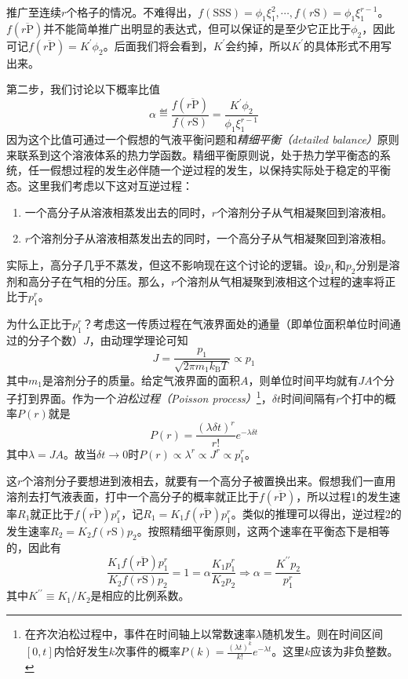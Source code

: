 \documentclass[main.tex]{subfiles}
\begin{document}
推广至连续$r$个格子的情况。不难得出，$f\left(\text{SSS}\right)=\phi_1\xi_1^2,\cdots,f\left(r\text{S}\right)=\phi_1\xi_1^{r-1}$。$f\left(\overline{r\text{P}}\right)$并不能简单推广出明显的表达式，但可以保证的是至少它正比于$\phi_2$，因此可记$f\left(\overline{r\text{P}}\right)=K^\prime\phi_2$。后面我们将会看到，$K^\prime$会约掉，所以$K^\prime$的具体形式不用写出来。

第二步，我们讨论以下概率比值
\[\alpha\eqdef\frac{f\left(\overline{r\text{P}}\right)}{f\left(r\text{S}\right)}=\frac{K^\prime\phi_2}{\phi_1\xi_1^{r-1}}\]
因为这个比值可通过一个假想的气液平衡问题和\emph{精细平衡（detailed balance）}原则来联系到这个溶液体系的热力学函数。精细平衡原则说，处于热力学平衡态的系统，任一假想过程的发生必伴随一个逆过程的发生，以保持实际处于稳定的平衡态。这里我们考虑以下这对互逆过程：
\begin{enumerate}
  \item 一个高分子从溶液相蒸发出去的同时，$r$个溶剂分子从气相凝聚回到溶液相。
  \item $r$个溶剂分子从溶液相蒸发出去的同时，一个高分子从气相凝聚回到溶液相。
\end{enumerate}
实际上，高分子几乎不蒸发，但这不影响现在这个讨论的逻辑。设$p_1$和$p_2$分别是溶剂和高分子在气相的分压。那么，$r$个溶剂从气相凝聚到液相这个过程的速率将正比于$p_1^r$。

为什么正比于$p_1^r$？考虑这一传质过程在气液界面处的通量（即单位面积单位时间通过的分子个数）$J$，由动理学理论可知
\[J=\frac{p_1}{\sqrt{2\pi m_1 k_\text{B}T}}\propto p_1\]
其中$m_1$是溶剂分子的质量。给定气液界面的面积$A$，则单位时间平均就有$JA$个分子打到界面。作为一个\emph{泊松过程（Poisson process）}\footnote{在齐次泊松过程中，事件在时间轴上以常数速率$\lambda$随机发生。则在时间区间$\left[0,t\right]$内恰好发生$k$次事件的概率$P\left(k\right)=\frac{\left(\lambda t\right)^k}{k!}e^{-\lambda t}$。这里$k$应该为非负整数。}，$\delta t$时间间隔有$r$个打中的概率$P\left(r\right)$就是
\[P\left(r\right)=\frac{\left(\lambda\delta t\right)^r}{r!}e^{-\lambda\delta t}\]
其中$\lambda=JA$。故当$\delta t\to 0$时$P\left(r\right)\propto\lambda^r\propto J^r\propto p_1^r$。

这$r$个溶剂分子要想进到液相去，就要有一个高分子被置换出来。假想我们一直用溶剂去打气液表面，打中一个高分子的概率就正比于$f\left(\overline{r\text{P}}\right)$，所以过程1的发生速率$R_1$就正比于$f\left(\overline{r\text{P}}\right)p_1^r$，记$R_1=K_1f\left(\overline{r\text{P}}\right)p_1^r$。类似的推理可以得出，逆过程2的发生速率$R_2=K_2f\left(r\text{S}\right)p_2$。按照精细平衡原则，这两个速率在平衡态下是相等的，因此有
\[\frac{K_1f\left(\overline{r\text{P}}\right)p_1^r}{K_2f\left(r\text{S}\right)p_2}=1=\alpha\frac{K_1p_1^r}{K_2p_2}\Rightarrow\alpha=\frac{K^{\prime\prime}p_2}{p_1^r}\]
其中$K^{\prime\prime}\equiv K_1/K_2$是相应的比例系数。
\end{document}
